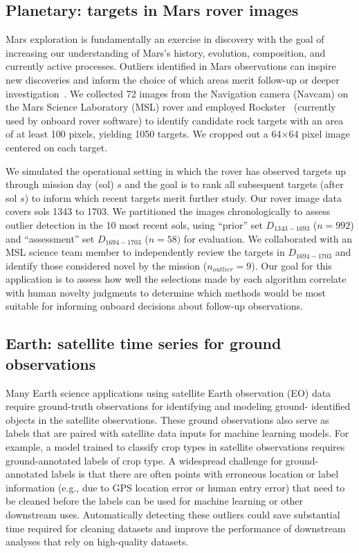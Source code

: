 \documentclass[utf8]{frontiersFPHY} %
\begin{document}
\subsection{Planetary: targets in Mars rover images}
Mars exploration is fundamentally an exercise in discovery with the
goal of increasing our understanding of Mars's history, evolution,
composition, and currently active processes.  Outliers
identified in Mars observations can inspire new discoveries and inform
the choice of which areas merit follow-up or deeper
investigation~\cite{kerner2020comparison,wagstaff:rover-novelty20}.
We collected \num{72} images from the Navigation camera (Navcam) 
on the Mars Science Laboratory (MSL) rover
and employed Rockster~\cite{burl:rockster16}
(currently used by onboard rover software) to identify candidate rock
targets with an area of at least 100 pixels, yielding \num{1050}
targets.  We cropped out a \num{64}$\times$\num{64} pixel image
centered on each target.

We simulated the operational setting in which the rover has observed
targets up through mission day (sol) $s$ and the goal is to rank all
subsequent targets (after sol $s$) to inform which recent targets
merit further study.  Our rover image data covers sols \num{1343}
to \num{1703}.  We partitioned the images chronologically to assess
outlier detection in the 10 most recent sols, using ``prior'' set
$D_{1343-1693}$ ($n=992$) and ``assessment'' set $D_{1694-1703}$
($n=58)$ for evaluation. We collaborated with an MSL science team member to
independently review the targets in $D_{1694-1703}$ and identify those
considered novel by the mission ($n_{outlier} = 9$).  Our goal for
this application is to assess how well the selections made by each
algorithm correlate with human novelty judgments to determine which
methods would be most suitable for informing onboard decisions about
follow-up observations.

\subsection{Earth: satellite time series for ground observations}
Many Earth science applications using satellite Earth observation (EO) data
require ground-truth observations for identifying and modeling ground-
identified objects in the satellite observations. These ground observations
also serve as labels that are paired with satellite data inputs for machine 
learning models. For example, a model trained to classify crop types in
satellite observations requires ground-annotated labels of crop type. 
A widespread challenge for ground-
annotated labels is that there are often points with erroneous location or 
label information (e.g., due to GPS location error or human entry error) that
need to be cleaned before the labels can be used for machine learning or
other downstream uses. Automatically detecting these outliers could save 
substantial time required for cleaning datasets and improve the performance of
downstream analyses that rely on high-quality datasets. 
\end{document}
